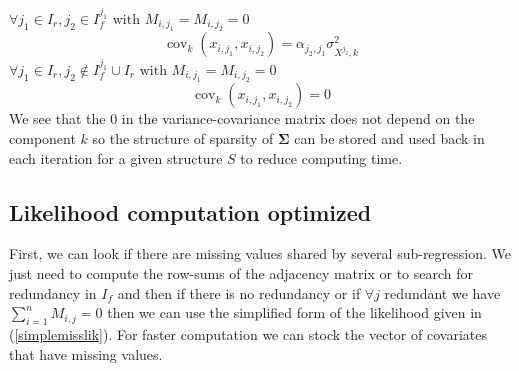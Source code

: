 \documentclass[11pt,a4paper]{report}
\begin{document}
	$\forall j_1 \in I_r, j_2 \in I_f^{j_1} \textrm{ with } M_{i,j_1}=M_{i,j_2}=0$
	\begin{equation}
	\operatorname{cov}_{k}(x_{i,j_1},x_{i,j_2})= \alpha_{j_2,j_1}\sigma^2_{X^{j_2},k}
\end{equation}
$\forall j_1 \in I_r, j_2 \notin I_f^{j_1}\cup I_r \textrm{ with } M_{i,j_1}=M_{i,j_2}=0$
	\begin{equation}
	\operatorname{cov}_{k}(x_{i,j_1},x_{i,j_2})= 0
\end{equation}
We see that the $0$ in the variance-covariance matrix does not depend on the component $k$ so the structure of sparsity of $\boldsymbol{\Sigma}$ can be stored and used back in each iteration for a given structure $S$ to reduce computing time.
	\subsection{Likelihood computation optimized}
		First, we can look if there are missing values shared by several sub-regression. We just need to compute the  row-sums of the adjacency matrix or to search for redundancy in $I_f$ and then if there is no redundancy or if $\forall j$ redundant we have $\sum_{i=1}^nM_{i,j}=0$ then we can use the simplified form of the likelihood given in (\ref{simplemisslik}). For faster computation we can stock the vector of covariates that have missing values.
\end{document}
